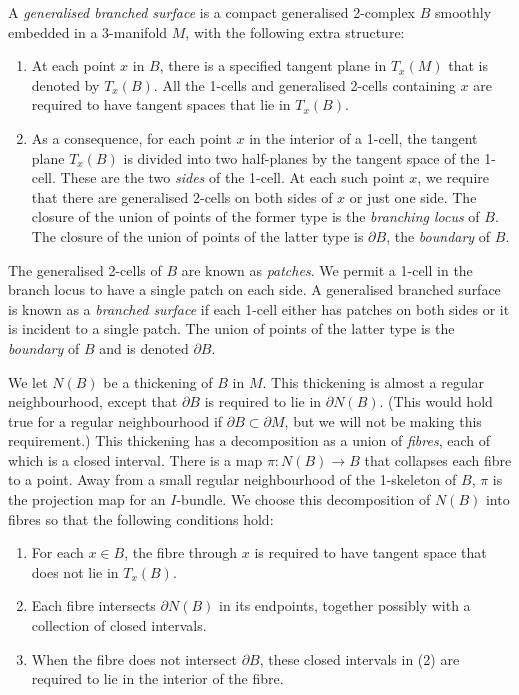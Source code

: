 \documentclass[oneside]{amsart}
\numberwithin{equation}{section}
\theoremstyle{plain}
\theoremstyle{definition}
\begin{document}
A \emph{generalised branched surface} is a compact generalised 2-complex $B$ smoothly embedded in a 3-manifold $M$,
with the following extra structure:
\begin{enumerate}
\item At each point $x$ in $B$, there is a specified tangent plane in $T_x(M)$ that is
denoted by $T_x(B)$. All the 1-cells and generalised 2-cells containing $x$ are required to have tangent
spaces that lie in $T_x(B)$.
\item As a consequence, for each point $x$ in the interior of a 1-cell, the tangent plane $T_x(B)$
is divided into two half-planes by the tangent space of the 1-cell. These are the two \emph{sides} of the 1-cell.
At each such point $x$, we require that there are generalised 2-cells on both sides of $x$ or
just one side. The closure of the union of points of the former type is
the \emph{branching locus} of $B$. The closure of the union of points of the latter type is
$\partial B$, the \emph{boundary} of $B$.
\end{enumerate}
The generalised 2-cells of $B$ are known as \emph{patches}. We permit a 1-cell in the branch locus to have 
a single patch on each side.
A generalised branched surface is known as a \emph{branched surface} if each 1-cell either has patches on
both sides or it is incident to a single patch. The union of points of the latter type is the \emph{boundary}
of $B$ and is denoted $\partial B$.

We let $N(B)$ be a thickening of $B$ in $M$. This thickening is almost a regular neighbourhood, except
that $\partial B$ is required to lie in $\partial N(B)$. (This would hold true for a regular neighbourhood
if $\partial B \subset \partial M$, but we will not be making this requirement.) This thickening has
a decomposition as a union of \emph{fibres}, each of which is a closed interval. There is a map
$\pi \colon N(B) \rightarrow B$ that collapses each fibre to a point. Away from a small regular neighbourhood
of the 1-skeleton of $B$, $\pi$ is the projection map for an $I$-bundle. We choose this decomposition of $N(B)$
into fibres so that the following conditions hold:
\begin{enumerate}
\item For each $x \in B$, the fibre through $x$ is required to have tangent space that does not
lie in $T_x(B)$.
\item Each fibre intersects $\partial N(B)$ in its endpoints, together possibly with a collection of
closed intervals.
\item When the fibre does not intersect $\partial B$, these closed intervals in (2) are
required to lie in the interior of the fibre.
\end{enumerate}
\end{document}
